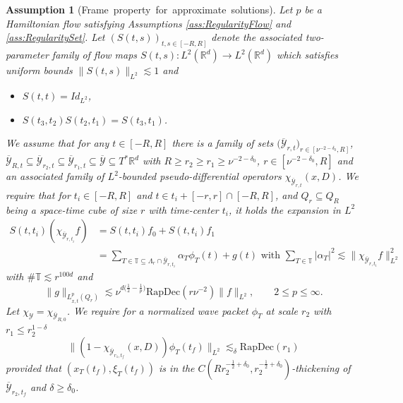 \documentclass{amsart}
\newtheorem{assumption}[theorem]{Assumption}
\theoremstyle{definition}
\newcommand{\R}{\mathbb{R}}
\newcommand{\T}{\mathbb{T}}
\begin{document}
\begin{assumption}[Frame~property~for~approximate~solutions]
\label{ass:Frames}
    Let $p$ be a Hamiltonian flow satisfying Assumptions \ref{ass:RegularityFlow} and \ref{ass:RegularitySet}. Let $(S(t,s))_{t,s \in [-R,R]}$ denote the associated two-parameter family of flow maps $S(t,s):L^2(\R^d) \to L^2(\R^d)$ which satisfies uniform bounds $\| S(t,s) \|_{L^2} \lesssim 1$ and
\begin{itemize}
    \item $S(t,t) = {Id}_{L^2}$, 
    \item $S(t_3,t_2) S(t_2,t_1) =S(t_3,t_1)$.
\end{itemize}
We assume that for any $t \in [-R,R]$ there is a family of sets $\big( \overline{\mathcal{Y}}_{r,t} \big)_{r \in [\nu^{-2-\delta_0},R]}$, $\overline{\mathcal{Y}}_{R,t} \subseteq \overline{\mathcal{Y}}_{r_2,t} \subseteq \overline{\mathcal{Y}}_{r_1,t} \subseteq \overline{\mathcal{Y}} \subseteq T^* \R^d$ with $R \geq r_2 \geq r_1 \geq \nu^{-2-\delta_0}$, $r \in [\nu^{-2-\delta_0},R]$ and an associated family of $L^2$-bounded pseudo-differential operators $\chi_{\overline{\mathcal{Y}}_{r,t}}(x,D)$. We require that for $t_i \in [-R,R]$ and $t \in t_i + [-r,r] \cap [-R,R]$, and $Q_r \subseteq Q_R$ being a space-time cube of size $r$ with time-center $t_i$, it holds the expansion in $L^2$
\begin{equation}
\label{eq:ExpansionInitialData}
\begin{split}
    S(t,t_i) (\chi_{\overline{\mathcal{Y}}_{r,t_i}} f) &= S(t,t_i) f_0 + S(t,t_i) f_1 \\
    &= \sum_{T \in \mathbb{T} \subseteq \Lambda_r \cap \overline{\mathcal{Y}}_{r,t_i}} \alpha_T \phi_T(t) + g(t) \text{ with } \sum_{T \in \mathbb{T}} |\alpha_T|^2 \lesssim \| \chi_{\overline{\mathcal{Y}}_{r,t_i}} f \|_{L^2}^2
\end{split}
\end{equation}
with $\# \T \lesssim r^{100d}$ and 
\begin{equation}
 \| g \|_{L_{x,t}^p(Q_r)} \lesssim \nu^{d \big( \frac{1}{2} - \frac{1}{p} \big)} \text{RapDec}(r \nu^{-2}) \| f \|_{L^2}, \qquad 2 \leq p \leq \infty.
\end{equation}
Let $\chi_{\mathcal{Y}} = \chi_{\overline{\mathcal{Y}}_{R,0}}$. We require for a normalized wave packet $\phi_T$ at scale $r_2$ with $r_1 \leq r_2^{1-\delta}$
\begin{equation}
\label{eq:WavePacketLocalizationFinal}
    \| (1-\chi_{\overline{\mathcal{Y}}_{r_1,t_f}} (x,D)) \phi_T(t_f) \|_{L^2} \lesssim_{\delta} \text{RapDec}(r_1)
\end{equation}
provided that $(x_T(t_f),\xi_T(t_f))$ is in the $C(R r_2^{-\frac{1}{2}+\delta_0},r_2^{-\frac{1}{2}+\delta_0})$-thickening of $\overline{\mathcal{Y}}_{r_2,t_f}$ and $\delta \geq \delta_0$.
\end{assumption}
\end{document}
